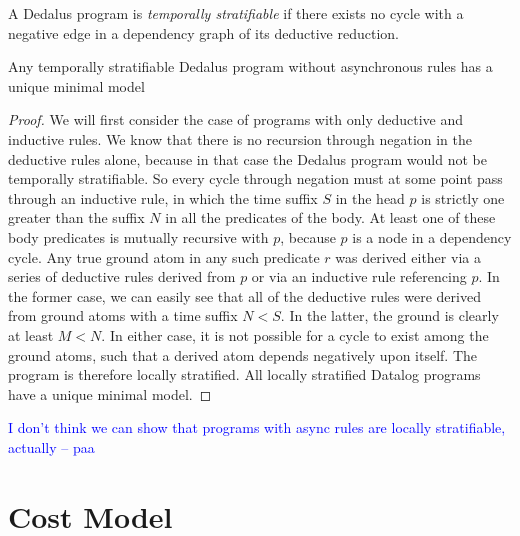 \documentclass{acm_proc_article-sp-sigmod09}
\newcommand{\paa}[1]{{\textcolor{blue}{#1 -- paa}}}
\begin{document}
\begin{definition}
A Dedalus program is \emph{temporally stratifiable} if there exists no cycle with a negative edge in a dependency graph of
its deductive reduction.
\end{definition}

\begin{lemma}
Any temporally stratifiable Dedalus program without asynchronous rules has a unique minimal model
\end{lemma}
\begin{proof}
We will first consider the case of programs with only deductive and inductive rules.  We know that there is no recursion
through negation in the deductive rules alone, because in that case the Dedalus program would not be temporally 
stratifiable.  So every cycle through negation must at some point pass through an inductive rule, in which the time suffix $S$ in
the head $p$ is strictly one greater than the suffix $N$ in all the predicates of the body.  At least one of these body predicates is mutually recursive
with $p$, because $p$ is a node in a dependency cycle.  Any true ground atom in any such predicate $r$
was derived either via a series of deductive rules derived from $p$ or via an inductive rule referencing $p$.  In the former case, we can
easily see that all of the deductive rules were derived from ground atoms with a time suffix $N < S$.  In the latter, the ground is clearly at 
least $M < N$.  In either case, it is not possible for a cycle to exist among the ground atoms, such that a derived atom depends negatively upon itself.
The program is therefore locally stratified.  All locally stratified Datalog programs have a unique minimal model.


\end{proof}

\paa{I don't think we can show that programs with async rules are locally stratifiable, actually}

\section{Cost Model}
 
\end{document}
